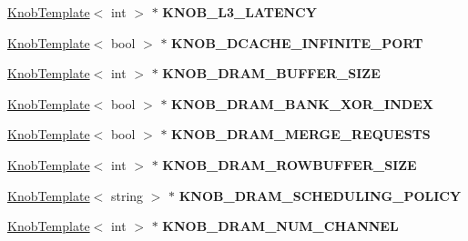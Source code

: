 \begin{DoxyCompactItemize}
\item 
\hypertarget{classall__knobs__c_af564ee51527a8798e4f2f073fb63f5a3}{
\hyperlink{classKnobTemplate}{KnobTemplate}$<$ int $>$ $\ast$ {\bfseries KNOB\_\-L3\_\-LATENCY}}
\label{classall__knobs__c_af564ee51527a8798e4f2f073fb63f5a3}

\item 
\hypertarget{classall__knobs__c_a3cd466362d16cfcac13060104fc52156}{
\hyperlink{classKnobTemplate}{KnobTemplate}$<$ bool $>$ $\ast$ {\bfseries KNOB\_\-DCACHE\_\-INFINITE\_\-PORT}}
\label{classall__knobs__c_a3cd466362d16cfcac13060104fc52156}

\item 
\hypertarget{classall__knobs__c_ad66ffdb37d0684a3e9ed5b09ef81f2e8}{
\hyperlink{classKnobTemplate}{KnobTemplate}$<$ int $>$ $\ast$ {\bfseries KNOB\_\-DRAM\_\-BUFFER\_\-SIZE}}
\label{classall__knobs__c_ad66ffdb37d0684a3e9ed5b09ef81f2e8}

\item 
\hypertarget{classall__knobs__c_a09b4074546d00fe1f3edaa6a72ac4f88}{
\hyperlink{classKnobTemplate}{KnobTemplate}$<$ bool $>$ $\ast$ {\bfseries KNOB\_\-DRAM\_\-BANK\_\-XOR\_\-INDEX}}
\label{classall__knobs__c_a09b4074546d00fe1f3edaa6a72ac4f88}

\item 
\hypertarget{classall__knobs__c_ab8c8f7669477589b1fda6e6daa87f620}{
\hyperlink{classKnobTemplate}{KnobTemplate}$<$ bool $>$ $\ast$ {\bfseries KNOB\_\-DRAM\_\-MERGE\_\-REQUESTS}}
\label{classall__knobs__c_ab8c8f7669477589b1fda6e6daa87f620}

\item 
\hypertarget{classall__knobs__c_aa4295e652e67016437728f114383921a}{
\hyperlink{classKnobTemplate}{KnobTemplate}$<$ int $>$ $\ast$ {\bfseries KNOB\_\-DRAM\_\-ROWBUFFER\_\-SIZE}}
\label{classall__knobs__c_aa4295e652e67016437728f114383921a}

\item 
\hypertarget{classall__knobs__c_a357f5a04308dcb32dbdf8ac947cb8593}{
\hyperlink{classKnobTemplate}{KnobTemplate}$<$ string $>$ $\ast$ {\bfseries KNOB\_\-DRAM\_\-SCHEDULING\_\-POLICY}}
\label{classall__knobs__c_a357f5a04308dcb32dbdf8ac947cb8593}

\item 
\hypertarget{classall__knobs__c_a9aa81870124952dcea7335ce157b3ab3}{
\hyperlink{classKnobTemplate}{KnobTemplate}$<$ int $>$ $\ast$ {\bfseries KNOB\_\-DRAM\_\-NUM\_\-CHANNEL}}
\label{classall__knobs__c_a9aa81870124952dcea7335ce157b3ab3}


\end{DoxyCompactItemize}
